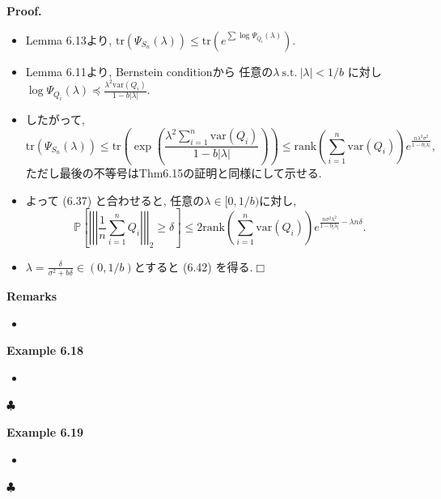 \documentclass[unicode,aspectratio=169,11pt]{beamer}
\def\qed{\hfill $\Box$}
\def\endexample{\hfill $\clubsuit$}
\newcommand{\var}{\mathrm{var}}
\newcommand{\bb}{\mathbb}
\newcommand{\trace}{\mathrm{tr}}
\begin{document}
\begin{frame}{}{}
{\bf Proof.}
\begin{itemize}
  \item Lemma 6.13より, $\trace(\Psi_{S_n}(\lambda)) \le \trace(e^{\sum \log \Psi_{Q_i}(\lambda)})$.
  \item Lemma 6.11より, Bernstein conditionから 任意の$\lambda\ \mathrm{s.t.}\ |\lambda| < 1/b$ に対し $\log \Psi_{Q_i}(\lambda) \preceq \frac{\lambda^2 \var(Q_i)}{1 - b|\lambda|}$.
  \item したがって, 
        \[
          \trace\left(\Psi_{S_n}(\lambda)\right)
          \le \trace\left(\exp\left( \frac{\lambda^2 \sum_{i=1}^n \var(Q_i)}{1 - b|\lambda|} \right)\right)
          \le \mathrm{rank}\left(\sum_{i=1}^n \var(Q_i)\right)e^{\frac{n\lambda^2\sigma^2}{1 - b|\lambda|}},
        \]
        ただし最後の不等号はThm6.15の証明と同様にして示せる.
  \item よって (6.37) と合わせると, 任意の$\lambda \in [0, 1/b)$に対し, 
        \[
          \bb{P}\left[\left|\left|\left|\frac{1}{n}\sum_{i=1}^n Q_i \right|\right|\right|_2 \ge \delta\right]
          \le 2 \mathrm{rank}\left(\sum_{i=1}^n \var(Q_i)\right) e^{\frac{n\sigma^2 \lambda^2}{1 - b|\lambda|} - \lambda n \delta}.
        \]
  \item $\lambda  = \frac{\delta}{\sigma^2 + b\delta} \in (0, 1/b)$とすると (6.42) を得る.\qed
\end{itemize}
\end{frame}

\begin{frame}{}{}
  {\bf Remarks}
  \begin{itemize}
    \item 
  \end{itemize}
\end{frame}

\begin{frame}{}{}
  {\bf Example 6.18}
  \begin{itemize}
    \item 
  \end{itemize}
  \endexample
\end{frame}

\begin{frame}{}{}
  {\bf Example 6.19}
  \begin{itemize}
    \item 
  \end{itemize}
  \endexample
\end{frame}
\end{document}
